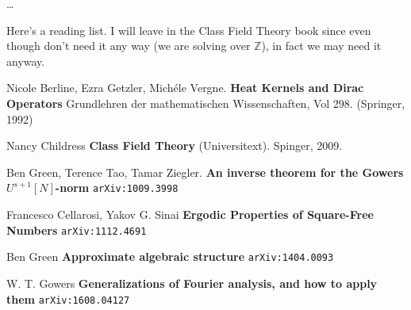 \documentclass[12pt]{article}
\begin{document}
\newpage

\noindent \dots 

\vfill


\noindent Here's a reading list. I will leave in the Class Field Theory book since even though don't need it any way (we are solving over $\mathbb{Z}$), in fact we may need it anyway.

\begin{thebibliography}{}

\item Nicole Berline, Ezra Getzler, Mich\'{e}le Vergne. \textbf{Heat Kernels and Dirac Operators} Grundlehren der mathematischen Wissenschaften, Vol 298. (Springer, 1992)

\item Nancy Childress \textbf{Class Field Theory} (Universitext).  Spinger, 2009.

\item Ben Green, Terence Tao, Tamar Ziegler. \textbf{An inverse theorem for the Gowers $U^{s+1}[N]$-norm} \texttt{arXiv:1009.3998}

\item Francesco Cellarosi, Yakov G. Sinai \textbf{Ergodic Properties of Square-Free Numbers} \texttt{arXiv:1112.4691}

\item Ben Green \textbf{Approximate algebraic structure} \texttt{arXiv:1404.0093}

\item W. T. Gowers \textbf{Generalizations of Fourier analysis, and how to apply them} \texttt{arXiv:1608.04127}

\end{thebibliography}

\end{document}
